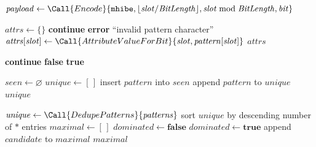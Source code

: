 \begin{algorithm}[t]
\caption{Pattern post-processing and attribute encoding}
\begin{algorithmic}[1]
    \State $\mathit{payload} \gets \Call{Encode}{\texttt{mhibe}, \lfloor \mathit{slot}/\mathit{BitLength} \rfloor, \mathit{slot} \bmod \mathit{BitLength}, \mathit{bit}}$
    \State \Return {}
\EndProcedure

    \State $\mathit{attrs} \gets \{\}$
            \State \textbf{continue}
        \EndIf
            \State \textbf{error} ``invalid pattern character''
        \EndIf
        \State $\mathit{attrs}[\mathit{slot}] \gets \Call{AttributeValueForBit}{\mathit{slot}, \mathit{pattern}[\mathit{slot}]}$
    \EndFor
    \State \Return $\mathit{attrs}$
\EndProcedure

            \State \textbf{continue}
        \EndIf
            \State \Return \textbf{false}
        \EndIf
    \EndFor
    \State \Return \textbf{true}
\EndProcedure

    \State $\mathit{seen} \gets \varnothing$
    \State $\mathit{unique} \gets [\,]$
            \State insert $\mathit{pattern}$ into $\mathit{seen}$
            \State append $\mathit{pattern}$ to $\mathit{unique}$
        \EndIf
    \EndFor
    \State \Return $\mathit{unique}$
\EndProcedure

    \State $\mathit{unique} \gets \Call{DedupePatterns}{\mathit{patterns}}$
    \State sort $\mathit{unique}$ by descending number of $\ast$ entries
    \State $\mathit{maximal} \gets [\,]$
        \State $\mathit{dominated} \gets \textbf{false}$
                \State $\mathit{dominated} \gets \textbf{true}$
            \EndIf
        \EndFor
            \State append $\mathit{candidate}$ to $\mathit{maximal}$
        \EndIf
    \EndFor
    \State \Return $\mathit{maximal}$
\EndProcedure
\end{algorithmic}
\end{algorithm}

